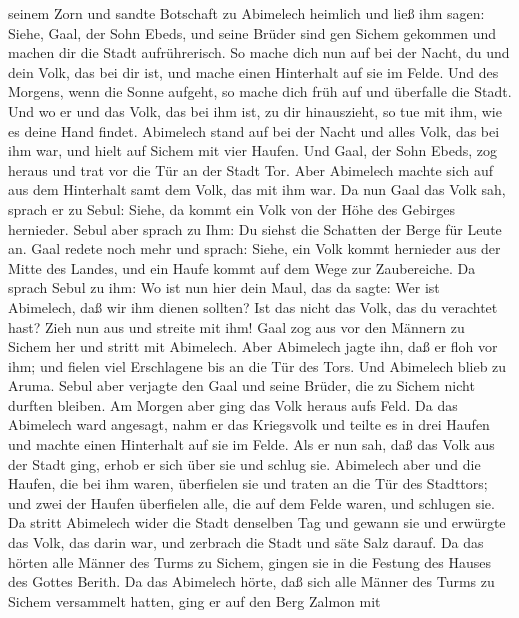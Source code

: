 seinem Zorn  und sandte Botschaft zu Abimelech heimlich und
ließ ihm sagen: Siehe, Gaal, der Sohn Ebeds, und seine Brüder sind gen
Sichem gekommen und machen dir die Stadt aufrührerisch.  So
mache dich nun auf bei der Nacht, du und dein Volk, das bei dir ist, und
mache einen Hinterhalt auf sie im Felde.  Und des Morgens,
wenn die Sonne aufgeht, so mache dich früh auf und überfalle die Stadt.
Und wo er und das Volk, das bei ihm ist, zu dir hinauszieht, so tue mit
ihm, wie es deine Hand findet.  Abimelech stand auf bei der
Nacht und alles Volk, das bei ihm war, und hielt auf Sichem mit vier
Haufen.  Und Gaal, der Sohn Ebeds, zog heraus und trat vor
die Tür an der Stadt Tor. Aber Abimelech machte sich auf aus dem
Hinterhalt samt dem Volk, das mit ihm war.  Da nun Gaal das
Volk sah, sprach er zu Sebul: Siehe, da kommt ein Volk von der Höhe des
Gebirges hernieder. Sebul aber sprach zu Ihm: Du siehst die Schatten der
Berge für Leute an.  Gaal redete noch mehr und sprach:
Siehe, ein Volk kommt hernieder aus der Mitte des Landes, und ein Haufe
kommt auf dem Wege zur Zaubereiche.  Da sprach Sebul zu
ihm: Wo ist nun hier dein Maul, das da sagte: Wer ist Abimelech, daß wir
ihm dienen sollten? Ist das nicht das Volk, das du verachtet hast? Zieh
nun aus und streite mit ihm!  Gaal zog aus vor den Männern
zu Sichem her und stritt mit Abimelech.  Aber Abimelech
jagte ihn, daß er floh vor ihm; und fielen viel Erschlagene bis an die
Tür des Tors.  Und Abimelech blieb zu Aruma. Sebul aber
verjagte den Gaal und seine Brüder, die zu Sichem nicht durften bleiben.
 Am Morgen aber ging das Volk heraus aufs Feld. Da das
Abimelech ward angesagt,  nahm er das Kriegsvolk und teilte
es in drei Haufen und machte einen Hinterhalt auf sie im Felde. Als er
nun sah, daß das Volk aus der Stadt ging, erhob er sich über sie und
schlug sie.  Abimelech aber und die Haufen, die bei ihm
waren, überfielen sie und traten an die Tür des Stadttors; und zwei der
Haufen überfielen alle, die auf dem Felde waren, und schlugen sie.
 Da stritt Abimelech wider die Stadt denselben Tag und
gewann sie und erwürgte das Volk, das darin war, und zerbrach die Stadt
und säte Salz darauf.  Da das hörten alle Männer des Turms
zu Sichem, gingen sie in die Festung des Hauses des Gottes Berith.
 Da das Abimelech hörte, daß sich alle Männer des Turms zu
Sichem versammelt hatten,  ging er auf den Berg Zalmon mit
